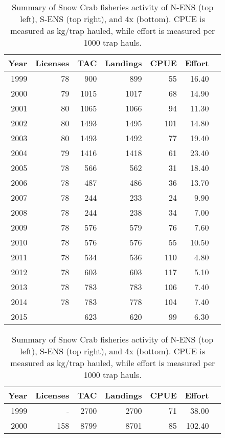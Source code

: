 \documentclass[paper=a4, fontsize=11pt]{article}
\begin{document}
\begin{table}[h]
\caption{ Summary of Snow Crab fisheries activity of N-ENS (top left), S-ENS (top right), and 4x (bottom). CPUE is measured as kg/trap hauled, while effort is measured per 1000 trap hauls.}
\begin{tabular}{rrrrrrr}
  \hline
 Year & Licenses & TAC & Landings & CPUE & Effort \\ 
  \hline
1999 &  78 & 900 & 899 &  55 & 16.40 \\ 
2000 &  79 & 1015 & 1017 &  68 & 14.90 \\ 
2001 &  80 & 1065 & 1066 &  94 & 11.30 \\ 
2002 &  80 & 1493 & 1495 & 101 & 14.80 \\ 
2003 &  80 & 1493 & 1492 &  77 & 19.40 \\ 
2004 &  79 & 1416 & 1418 &  61 & 23.40 \\ 
2005 &  78 & 566 & 562 &  31 & 18.40 \\ 
2006 &  78 & 487 & 486 &  36 & 13.70 \\ 
2007 &  78 & 244 & 233 &  24 & 9.90 \\ 
2008 &  78 & 244 & 238 &  34 & 7.00 \\ 
2009 &  78 & 576 & 579 &  76 & 7.60 \\ 
2010 &  78 & 576 & 576 &  55 & 10.50 \\ 
2011 &  78 & 534 & 536 & 110 & 4.80 \\ 
2012 &  78 & 603 & 603 & 117 & 5.10 \\ 
2013 &  78 & 783 & 783 & 106 & 7.40 \\ 
2014 &  78 & 783 & 778 & 104 & 7.40 \\ 
2015 &  & 623 & 620 &  99 & 6.30 \\ 
   \hline
\end{tabular}
\qquad
\begin{tabular}{rrrrrrr}
  \hline
Year & Licenses & TAC & Landings & CPUE & Effort \\ 
  \hline
1999 & - & 2700 & 2700 &  71 & 38.00 \\ 
2000 & 158 & 8799 & 8701 &  85 & 102.40 \\ 

\end{tabular}
\end{table}
\end{document}
